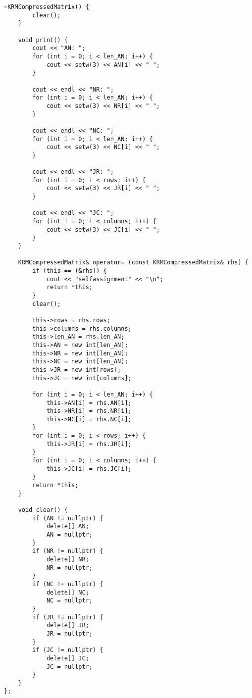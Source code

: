 \begin{lstlisting}[label = list1, caption = Программная реализация вспомогательных структур]
	~KRMCompressedMatrix() {
		clear();
	}
	
	void print() {
		cout << "AN: ";
		for (int i = 0; i < len_AN; i++) {
			cout << setw(3) << AN[i] << " ";
		}
		
		cout << endl << "NR: ";
		for (int i = 0; i < len_AN; i++) {
			cout << setw(3) << NR[i] << " ";
		}
		
		cout << endl << "NC: ";
		for (int i = 0; i < len_AN; i++) {
			cout << setw(3) << NC[i] << " ";
		}
		
		cout << endl << "JR: ";
		for (int i = 0; i < rows; i++) {
			cout << setw(3) << JR[i] << " ";
		}
		
		cout << endl << "JC: ";
		for (int i = 0; i < columns; i++) {
			cout << setw(3) << JC[i] << " ";
		}
	}
	
	KRMCompressedMatrix& operator= (const KRMCompressedMatrix& rhs) {
		if (this == (&rhs)) {
			cout << "selfassignment" << "\n";
			return *this;
		}
		clear();
		
		this->rows = rhs.rows;
		this->columns = rhs.columns;
		this->len_AN = rhs.len_AN;
		this->AN = new int[len_AN];
		this->NR = new int[len_AN];
		this->NC = new int[len_AN];
		this->JR = new int[rows];
		this->JC = new int[columns];
		
		for (int i = 0; i < len_AN; i++) {
			this->AN[i] = rhs.AN[i];
			this->NR[i] = rhs.NR[i];
			this->NC[i] = rhs.NC[i];
		}
		for (int i = 0; i < rows; i++) {
			this->JR[i] = rhs.JR[i];
		}
		for (int i = 0; i < columns; i++) {
			this->JC[i] = rhs.JC[i];
		}
		return *this;
	}
	
	void clear() {
		if (AN != nullptr) {
			delete[] AN;
			AN = nullptr;
		}
		if (NR != nullptr) {
			delete[] NR;
			NR = nullptr;
		}
		if (NC != nullptr) {
			delete[] NC;
			NC = nullptr;
		}
		if (JR != nullptr) {
			delete[] JR;
			JR = nullptr;
		}
		if (JC != nullptr) {
			delete[] JC;
			JC = nullptr;
		}
	}
};
\end{lstlisting}

